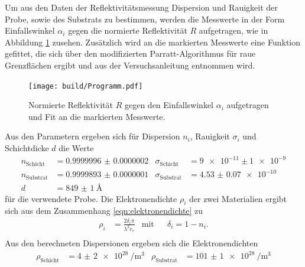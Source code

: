 Um aus den Daten der Reflektivitätsmessung Dispersion und Rauigkeit
der Probe, sowie des Substrats zu bestimmen, werden die Messwerte in der Form
Einfallswinkel $\alpha_i$ gegen die
normierte Reflektivität $R$ aufgetragen, wie in Abbildung \ref{fig:messung}
zusehen. Zusätzlich wird an die markierten Messwerte
eine Funktion gefittet, die
sich über den
modifizierten Parratt-Algorithmus für raue Grenzflächen ergibt und
aus der Versuchsanleitung \cite{sample} entnommen wird.




\begin{figure}
 \centering
   \texttt{[image: build/Programm.pdf]}
   \caption{Normierte Reflektivität $R$ gegen den Einfallswinkel $\alpha_i$ aufgetragen und Fit an die markierten Messwerte.}
   \label{fig:messung}
\end{figure}

Aus den Parametern ergeben sich für Dispersion $n_i$, Rauigkeit $\sigma_i$ und Schichtdicke $d$ die Werte
\begin{align}
  n_{\mathrm{Schicht}}&= \num{0.9999996(2)}  & \sigma_{\mathrm{Schicht}}&= \num{9e-11} \pm \num{1e-9} \\
  n_{\mathrm{Substrat}}&= \num{0.9999893(1)} & \sigma_{\mathrm{Substrat}}&= \SI{4.53(7)e-10}{}\\ %
  d& =\SI{849(1)}{\angstrom}
\end{align}
für die verwendete Probe.
Die Elektronendichte $\rho_i$ der zwei Materialien ergibt sich aus dem Zusammenhang \eqref{eqn:elektronendichte} zu
\begin{align}
\rho_i&=\frac{2\delta_i \pi}{\lambda^2 r_e} &\text{mit}&  &\delta_i = 1 - n_i.\\
\end{align}
Aus den berechneten Dispersionen ergeben sich die Elektronendichten
\begin{align}
\rho_{\mathrm{Schicht}}&=\SI{4(2)e28}{\per\cubic\meter}  & \rho_{\mathrm{Substrat}}&=\SI{101(1)e28}{\per\cubic\meter}
\end{align}
